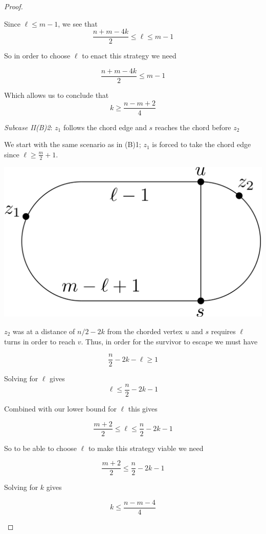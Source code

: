 \documentclass[letterpaper, 10pt]{article}
\begin{document}
\begin{proof}
\begin{proofpart}
Since $\ell \leq m -1$, we see that
\[ \frac{n+m-4k}{2} \leq \ell \leq m-1 \]

So in order to choose $\ell$ to enact this strategy we need

\[ \frac{n+m-4k}{2} \leq m-1 \]

Which allows us to conclude that
\[ k \geq \frac{n-m+2}{4} \]

\emph{Subcase II(B)2}: $z_1$ follows the chord edge and $s$ reaches the chord before $z_2$

We start with the same scenario as in (B)1; $z_1$ is forced to take the chord edge since
$\ell \geq \frac{m}{2} +1$.

\begin{center}
\includegraphics[scale=0.15]{diagramCaseIIB2_2}
\end{center}

$z_2$ was at a distance of $n/2-2k$ from the chorded vertex $u$ and $s$ requires
$\ell$ turns in order to reach $v$. Thus, in order for the survivor to escape
we must have

\[ \frac{n}{2} -2k - \ell \geq 1 \]

Solving for $\ell$ gives
\[ \ell \leq \frac{n}{2} -2k -1 \]

Combined with our lower bound for $\ell$ this gives

\[ \frac{m+2}{2} \leq \ell \leq \frac{n}{2} -2k -1 \]

So to be able to choose $\ell$ to make this strategy viable we need

\[ \frac{m+2}{2} \leq \frac{n}{2} -2k -1 \]

Solving for $k$ gives

\[ k \leq \frac{n-m-4}{4} \]

\end{proofpart}


\end{proof}
\end{document}
